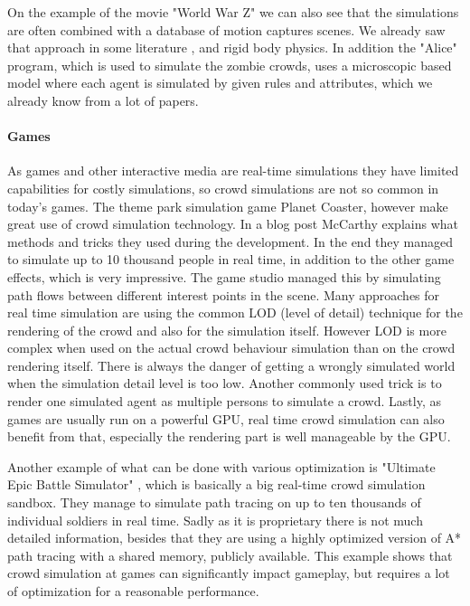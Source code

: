 \documentclass{acmsiggraph}               %
\begin{document}
On the example of the movie "World War Z" we can also see that the simulations are often combined with a database of motion captures scenes. We already saw that approach in some literature \cite{thalmann_crowd_2013}, and rigid body physics. In addition the "Alice" program, which is used to simulate the zombie crowds, uses a microscopic based model where each agent is simulated by given rules and attributes, which we already know from a lot of papers. \cite{wired_worldwarz_doku} 


\paragraph{Games}

As games and other interactive media are real-time simulations they have limited capabilities for costly simulations, so crowd simulations are not so common in today's games. The theme park simulation game Planet Coaster, however make great use of crowd simulation technology. In a blog post McCarthy  explains what methods and tricks they used during the development. In the end they managed to simulate up to 10 thousand people in real time, in addition to the other game effects, which is very impressive. The game studio managed this by simulating path flows between different interest points in the scene.   
Many approaches for real time simulation are using the common LOD (level of detail) technique for the rendering of the crowd and also for the simulation itself. However LOD is more complex when used on the actual crowd behaviour simulation than on the crowd rendering itself. There is always the danger of getting a wrongly simulated world when the simulation detail level is too low. Another commonly used trick is to render one simulated agent as multiple persons to simulate a crowd. Lastly, as games are usually run on a powerful GPU, real time crowd simulation can also benefit from that, especially the rendering part is well manageable by the GPU.

Another example of what can be done with various optimization is "Ultimate Epic Battle Simulator" \cite{ultimeEpicBattleSim_video} , which is basically a big real-time crowd simulation sandbox. They manage to simulate path tracing on up to ten thousands of individual soldiers in real time. Sadly as it is proprietary there is not much detailed information, besides that they are using a highly optimized version of A* path tracing \label{term:A*Usage} with a shared memory, publicly available. 
This example shows that crowd simulation at games can significantly impact gameplay, but requires a lot of optimization for a reasonable performance.
\end{document}
